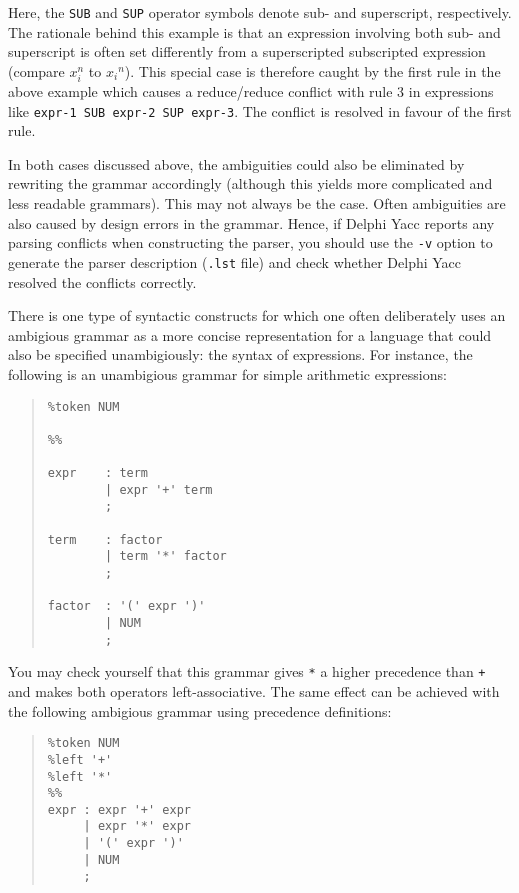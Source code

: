 \documentclass[a4paper]{article}
\begin{document}
Here, the \verb"SUB" and \verb"SUP" operator symbols denote sub- and
superscript, respectively. The rationale behind this example is that
an expression involving both sub- and superscript is often set differently
from a superscripted subscripted expression (compare $x_i^n$ to ${x_i}^n$).
This special case is therefore caught by the first rule in the above example
which causes a reduce/reduce conflict with rule 3 in expressions like
\verb"expr-1 SUB expr-2 SUP expr-3". The conflict is resolved in favour of
the first rule.

In both cases discussed above, the ambiguities could also be eliminated
by rewriting the grammar accordingly (although this yields more complicated
and less readable grammars). This may not always be the case. Often
ambiguities are also caused by design errors in the grammar. Hence, if
Delphi Yacc reports any parsing conflicts when constructing the parser, you
should use the \verb"-v" option to generate the parser description
(\verb".lst" file) and check whether Delphi Yacc resolved the conflicts correctly.

There is one type of syntactic constructs for which one often deliberately
uses an ambigious grammar as a more concise representation for a language
that could also be specified unambigiously: the syntax of expressions.
For instance, the following is an unambigious grammar for simple arithmetic
expressions:

\begin{quote}\begin{verbatim}
%token NUM

%%

expr    : term
        | expr '+' term
        ;

term    : factor
        | term '*' factor
        ;

factor  : '(' expr ')'
        | NUM
        ;
\end{verbatim}\end{quote}

You may check yourself that this grammar gives \verb"*" a higher precedence
than \verb"+" and makes both operators left-associative. The same effect can
be achieved with the following ambigious grammar using precedence definitions:

\begin{quote}\begin{verbatim}
%token NUM
%left '+'
%left '*'
%%
expr : expr '+' expr
     | expr '*' expr
     | '(' expr ')'
     | NUM
     ;
\end{verbatim}\end{quote}
\end{document}

